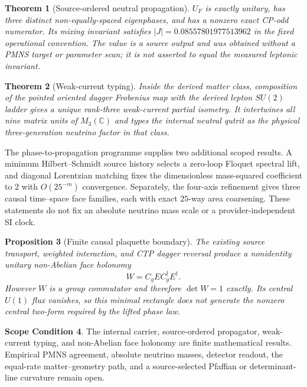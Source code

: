 \documentclass[11pt]{article}
\newtheorem{theorem}{Theorem}[section]
\newtheorem{proposition}[theorem]{Proposition}
\theoremstyle{definition}
\newtheorem{scope}[theorem]{Scope Condition}
\theoremstyle{remark}
\begin{document}
\begin{theorem}[Source-ordered neutral propagation]
$U_F$ is exactly unitary, has three distinct non-equally-spaced eigenphases,
and has a nonzero exact CP-odd numerator. Its mixing invariant satisfies
$|J|=0.08557801977513962$ in the fixed operational convention. The value is a
source output and was obtained without a PMNS target or parameter scan; it is
not asserted to equal the measured leptonic invariant.
\end{theorem}

\begin{theorem}[Weak-current typing]
Inside the derived matter class, composition of the pointed oriented dagger
Frobenius map with the derived lepton $SU(2)$ ladder gives a unique rank-three
weak-current partial isometry. It intertwines all nine matrix units of
$M_3(\mathbb C)$ and types the internal neutral qutrit as the physical
three-generation neutrino factor in that class.
\end{theorem}

The phase-to-propagation programme supplies two additional scoped results. A
minimum Hilbert--Schmidt source history selects a zero-loop Floquet spectral
lift, and diagonal Lorentzian matching fixes the dimensionless mass-squared
coefficient to $2$ with $O(25^{-m})$ convergence. Separately, the four-axis
refinement gives three causal time--space face families, each with exact
$25$-way area coarsening. These statements do not fix an absolute neutrino
mass scale or a provider-independent SI clock.

\begin{proposition}[Finite causal plaquette boundary]
The existing source transport, weighted interaction, and CTP dagger reversal
produce a nonidentity unitary non-Abelian face holonomy
\begin{equation}
W=C_gEC_g^\dagger E^\dagger.
\end{equation}
However $W$ is a group commutator and therefore $\det W=1$ exactly. Its
central $U(1)$ flux vanishes, so this minimal rectangle does not generate the
nonzero central two-form required by the lifted phase law.
\end{proposition}

\begin{scope}
The internal carrier, source-ordered propagator, weak-current typing, and
non-Abelian face holonomy are finite mathematical results. Empirical PMNS
agreement, absolute neutrino masses, detector readout, the equal-rate
matter--geometry path, and a source-selected Pfaffian or determinant-line
curvature remain open.
\end{scope}
\end{document}
